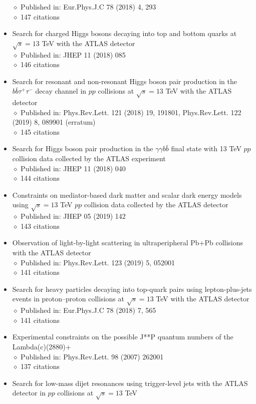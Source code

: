 \documentclass[margin, 10pt]{res} %
\begin{document}
\begin{resume}
\begin{itemize}
$\diamond$ Published in: Eur.Phys.J.C 78 (2018) 4, 293\\
$\diamond$ 147 citations
\item Search for charged Higgs bosons decaying into top and bottom quarks at $\sqrt{s} = 13$ TeV with the ATLAS detector\\
$\diamond$ Published in: JHEP 11 (2018) 085\\
$\diamond$ 146 citations
\item Search for resonant and non-resonant Higgs boson pair production in the $b\bar{b}\tau^{+}\tau^{-}$ decay channel in $pp$ collisions at $\sqrt{s} = 13$ TeV with the ATLAS detector\\
$\diamond$ Published in: Phys.Rev.Lett. 121 (2018) 19, 191801, Phys.Rev.Lett. 122 (2019) 8, 089901 (erratum)\\
$\diamond$ 145 citations
\item Search for Higgs boson pair production in the $\gamma \gamma b\bar{b}$ final state with 13 TeV $pp$ collision data collected by the ATLAS experiment\\
$\diamond$ Published in: JHEP 11 (2018) 040\\
$\diamond$ 144 citations
\item Constraints on mediator-based dark matter and scalar dark energy models using $\sqrt{s} = 13$ TeV $pp$ collision data collected by the ATLAS detector\\
$\diamond$ Published in: JHEP 05 (2019) 142\\
$\diamond$ 143 citations
\item Observation of light-by-light scattering in ultraperipheral Pb+Pb collisions with the ATLAS detector\\
$\diamond$ Published in: Phys.Rev.Lett. 123 (2019) 5, 052001\\
$\diamond$ 141 citations
\item Search for heavy particles decaying into top-quark pairs using lepton-plus-jets events in proton–proton collisions at $\sqrt{s} = 13$ TeV with the ATLAS detector\\
$\diamond$ Published in: Eur.Phys.J.C 78 (2018) 7, 565\\
$\diamond$ 141 citations
\item Experimental constraints on the possible J**P quantum numbers of the Lambda(c)(2880)+\\
$\diamond$ Published in: Phys.Rev.Lett. 98 (2007) 262001\\
$\diamond$ 137 citations
\item Search for low-mass dijet resonances using trigger-level jets with the ATLAS detector in $pp$ collisions at $\sqrt{s} = 13$ TeV\\

\end{itemize}
\end{resume}
\end{document}
